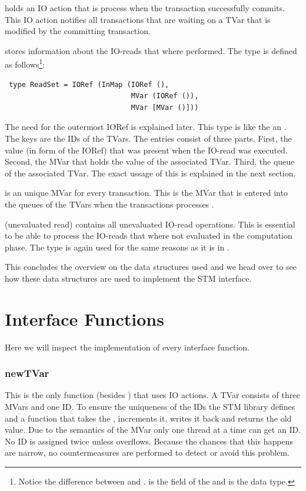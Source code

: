  holds an IO action that is process when the transaction successfully commits.
This IO action notifies all transactions that are waiting on a TVar that is modified by the 
committing transaction.

 stores information about the IO-reads that where performed. The type 
is defined as follows\footnote{Notice the difference between 
 and .  is the field of the  and 
 is the data type.}:
\begin{lstlisting}
 type ReadSet = IORef (InMap (IORef (), 
                              MVar (IORef ()), 
                              MVar [MVar ()]))
\end{lstlisting}
The need for the outermost IORef is explained later. This type is like the  an 
. The keys are the IDs of the TVars. The entries consist of three parts. First,
the value (in form of the IORef) that was present when the IO-read was executed. Second, the 
MVar that holds the value of the associated TVar. Third, the queue of the associated TVar.
The exact ussage of this is explained in the next section.

 is an unique MVar for every transaction. This is the MVar that is entered into
the queues of the TVars when the transactions processes .

(unevaluated read) contains all unevaluated IO-read operations. This is essential to be able to 
process the IO-reads that where not evaluated in the computation phase. The  type
is again used for the same reasons as it is in .

This concludes the overview on the data structures used and we head over to see how these
data structures are used to implement the STM interface.

\section{Interface Functions}
\label{sec:IFFun}
Here we will inspect the implementation of every interface function. 

\subsubsection{newTVar}
\label{sec:newTVar}
This is the only function (besides ) that uses IO actions. A TVar consists of three MVars
and one ID. To ensure the uniqueness of the IDs the STM library defines 
and a function  that takes the , increments it, writes it back 
and returns the old value. Due to the semantics of the MVar only one thread at a time can get an ID. 
No ID is assigned twice unless  overflows. Because the chances that this happens 
are narrow, no countermeasures are performed to detect or avoid this problem. 

